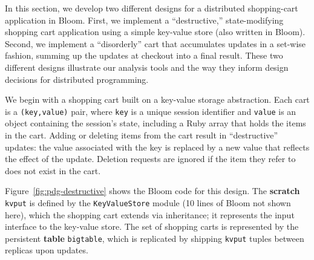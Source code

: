 In this section, we develop two different designs for a distributed shopping-cart
application in Bloom.  First, we implement a ``destructive,'' state-modifying
shopping cart application using a simple key-value store (also written in Bloom).
Second, we implement a ``disorderly'' cart that accumulates updates in a 
set-wise fashion, summing up the updates at checkout into a final result.  These two different designs illustrate our analysis tools and the way they inform design decisions for distributed programming.

We begin with a shopping cart built on a key-value storage abstraction.  Each
cart is a \texttt{(key,value)} pair, where \texttt{key} is a unique session
identifier and \texttt{value} is an object containing the session's state,
including a Ruby array that holds the items in the cart. Adding or deleting
items from the cart result in ``destructive'' updates: the value associated with
the key is replaced by a new value that reflects the effect of the
update. Deletion requests are ignored if the item they refer to does not exist
in the cart.

Figure~\ref{fig:pdg-destructive} shows the Bloom code for this design.  The
\textbf{scratch} \texttt{kvput} is defined by the \texttt{KeyValueStore} module (10
lines of Bloom not shown here), which the shopping cart extends via
inheritance; it represents the input interface to the key-value store.
The set of shopping carts is represented by the persistent \textbf{table} \texttt{bigtable}, which is replicated
by shipping \texttt{kvput} tuples between replicas upon updates. 

